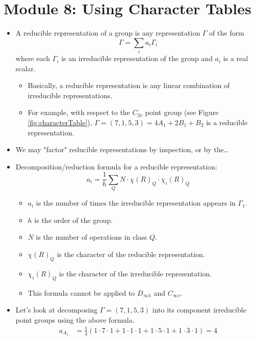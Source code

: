 \documentclass[../notes.tex]{subfiles}
\begin{document}
\section{Module 8: Using Character Tables}
\begin{itemize}
    \item A reducible representation of a group is any representation $\Gamma$ of the form
    \begin{equation*}
        \Gamma = \sum_ia_i\Gamma_i
    \end{equation*}
    where each $\Gamma_i$ is an irreducible representation of the group and $a_i$ is a real scalar.
    \begin{itemize}
        \item Basically, a reducible representation is any linear combination of irreducible representations.
        \item For example, with respect to the $C_{2v}$ point group (see Figure \ref{fig:characterTable}), $\Gamma=(7,1,5,3)=4A_1+2B_1+B_2$ is a reducible representation.
    \end{itemize}
    \item We may "factor" reducible representations by inspection, or by the\dots
    \item Decomposition/reduction formula for a reducible representation:
    \begin{equation*}
        a_i = \frac{1}{h}\sum_QN\cdot\chi(R)_Q\cdot\chi_i(R)_Q
    \end{equation*}
    \begin{itemize}
        \item $a_i$ is the number of times the irreducible representation appears in $\Gamma_1$.
        \item $h$ is the order of the group.
        \item $N$ is the number of operations in class $Q$.
        \item $\chi(R)_Q$ is the character of the reducible representation.
        \item $\chi_i(R)_Q$ is the character of the irreducible representation.
        \item This formula cannot be applied to $D_{\infty h}$ and $C_{\infty v}$.
    \end{itemize}
    \item Let's look at decomposing $\Gamma=(7,1,5,3)$ into its component irreducible point groups using the above formula.
    \begin{align*}
        a_{A_1} &= \frac{1}{4}(1\cdot 7\cdot 1+1\cdot 1\cdot 1 +1\cdot 5\cdot 1 +1\cdot 3\cdot 1 ) = 4\\

\end{align*}
\end{itemize}
\end{document}

